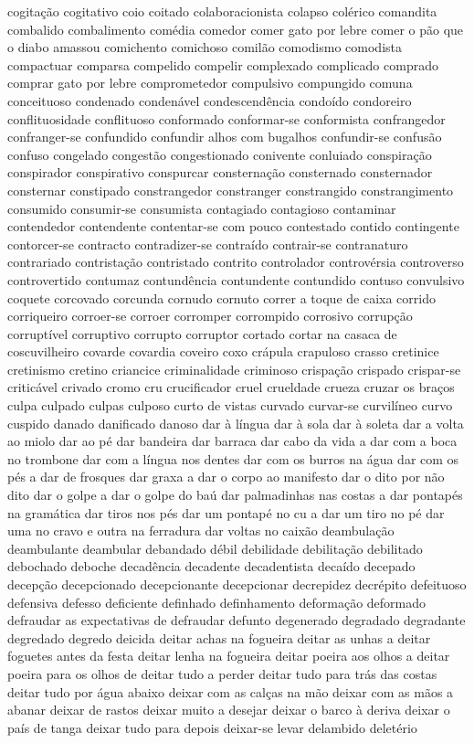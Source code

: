 cogita\c{c}\~ao cogitativo coio coitado colaboracionista colapso col\'{e}rico comandita combalido combalimento com\'{e}dia comedor comer gato por lebre comer o p\~ao que o diabo amassou comichento comichoso comil\~ao comodismo comodista compactuar comparsa compelido compelir complexado complicado comprado comprar gato por lebre comprometedor compulsivo compungido comuna conceituoso condenado conden\'{a}vel condescend\^{e}ncia condo\'{i}do condoreiro conflituosidade conflituoso conformado conformar-se conformista confrangedor confranger-se confundido confundir alhos com bugalhos confundir-se confus\~ao confuso congelado congest\~ao congestionado conivente conluiado conspira\c{c}\~ao conspirador conspirativo conspurcar consterna\c{c}\~ao consternado consternador consternar constipado constrangedor constranger constrangido constrangimento consumido consumir-se consumista contagiado contagioso contaminar contendedor contendente contentar-se com pouco contestado contido contingente contorcer-se contracto contradizer-se contra\'{i}do contrair-se contranaturo contrariado contrista\c{c}\~ao contristado contrito controlador controv\'{e}rsia controverso controvertido contumaz contund\^{e}ncia contundente contundido contuso convulsivo coquete corcovado corcunda cornudo cornuto correr a toque de caixa corrido corriqueiro corroer-se corroer corromper corrompido corrosivo corrup\c{c}\~ao corrupt\'{i}vel corruptivo corrupto corruptor cortado cortar na casaca de coscuvilheiro covarde covardia coveiro coxo cr\'{a}pula crapuloso crasso cretinice cretinismo cretino criancice criminalidade criminoso crispa\c{c}\~ao crispado crispar-se critic\'{a}vel crivado cromo cru crucificador cruel crueldade crueza cruzar os bra\c{c}os culpa culpado culpas culposo curto de vistas curvado curvar-se curvil\'{i}neo curvo cuspido danado danificado danoso dar \`{a} l\'{i}ngua dar \`{a} sola dar \`{a} soleta dar a volta ao miolo dar ao p\'{e} dar bandeira dar barraca dar cabo da vida a dar com a boca no trombone dar com a l\'{i}ngua nos dentes dar com os burros na \'{a}gua dar com os p\'{e}s a dar de frosques dar graxa a dar o corpo ao manifesto dar o dito por n\~ao dito dar o golpe a dar o golpe do ba\'{u} dar palmadinhas nas costas a dar pontap\'{e}s na gram\'{a}tica dar tiros nos p\'{e}s dar um pontap\'{e} no cu a dar um tiro no p\'{e} dar uma no cravo e outra na ferradura dar voltas no caix\~ao deambula\c{c}\~ao deambulante deambular debandado d\'{e}bil debilidade debilita\c{c}\~ao debilitado debochado deboche decad\^{e}ncia decadente decadentista deca\'{i}do decepado decep\c{c}\~ao decepcionado decepcionante decepcionar decrepidez decr\'{e}pito defeituoso defensiva defesso deficiente definhado definhamento deforma\c{c}\~ao deformado defraudar as expectativas de defraudar defunto degenerado degradado degradante degredado degredo deicida deitar achas na fogueira deitar as unhas a deitar foguetes antes da festa deitar lenha na fogueira deitar poeira aos olhos a deitar poeira para os olhos de deitar tudo a perder deitar tudo para tr\'{a}s das costas deitar tudo por \'{a}gua abaixo deixar com as cal\c{c}as na m\~ao deixar com as m\~aos a abanar deixar de rastos deixar muito a desejar deixar o barco \`{a} deriva deixar o pa\'{i}s de tanga deixar tudo para depois deixar-se levar delambido delet\'{e}rio 